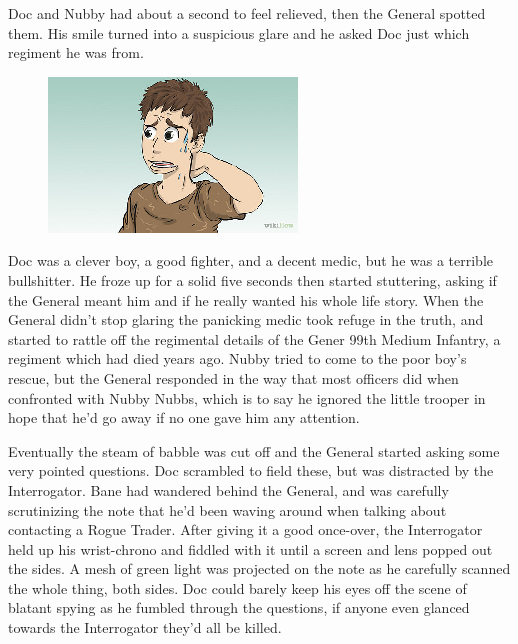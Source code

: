Doc and Nubby had about a second to feel relieved, then the General spotted them. 
His smile turned into a suspicious glare and he asked Doc just which regiment he was from.

\begin{figure}
	\begin{center}
		\includegraphics[width=\figwidth]{pics/9/30.png}
	\end{center}
\end{figure}
Doc was a clever boy, a good fighter, and a decent medic, but he was a terrible bullshitter. 
He froze up for a solid five seconds then started stuttering, asking if the General meant him and if he really wanted his whole life story. 
When the General didn't stop glaring the panicking medic took refuge in the truth, and started to rattle off the regimental details of the Gener 99th Medium Infantry, a regiment which had died years ago. 
Nubby tried to come to the poor boy's rescue, but the General responded in the way that most officers did when confronted with Nubby Nubbs, which is to say he ignored the little trooper in hope that he'd go away if no one gave him any attention.

Eventually the steam of babble was cut off and the General started asking some very pointed questions. 
Doc scrambled to field these, but was distracted by the Interrogator. 
Bane had wandered behind the General, and was carefully scrutinizing the note that he'd been waving around when talking about contacting a Rogue Trader. 
After giving it a good once-over, the Interrogator held up his wrist-chrono and fiddled with it until a screen and lens popped out the sides. 
A mesh of green light was projected on the note as he carefully scanned the whole thing, both sides. 
Doc could barely keep his eyes off the scene of blatant spying as he fumbled through the questions, if anyone even glanced towards the Interrogator they'd all be killed.

